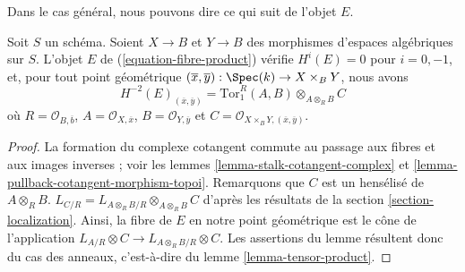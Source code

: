 \noindent
Dans le cas général, nous pouvons dire ce qui suit de l'objet $E$.

\begin{lemma}
\label{lemma-fibre-product}
Soit $S$ un schéma. Soient $X \to B$ et $Y \to B$ des morphismes d'espaces
algébriques sur $S$. L'objet $E$ de (\ref{equation-fibre-product}) vérifie
$H^i(E) = 0$ pour $i = 0, -1$, et, pour tout point géométrique
$(\overline{x}, \overline{y}) : \Spec(k) \to X \times_B Y$, nous avons
$$
H^{-2}(E)_{(\overline{x}, \overline{y})} =
\text{Tor}_1^R(A, B) \otimes_{A \otimes_R B} C
$$
où $R = \mathcal{O}_{B, \overline{b}}$, $A = \mathcal{O}_{X, \overline{x}}$,
$B = \mathcal{O}_{Y, \overline{y}}$ et
$C = \mathcal{O}_{X \times_B Y, (\overline{x}, \overline{y})}$.
\end{lemma}

\begin{proof}
La formation du complexe cotangent commute au passage aux fibres et aux images
inverses ; voir les lemmes \ref{lemma-stalk-cotangent-complex} et
\ref{lemma-pullback-cotangent-morphism-topoi}. Remarquons que $C$ est un
hensélisé de $A \otimes_R B$.
$L_{C/R} = L_{A \otimes_R B/R} \otimes_{A \otimes_R B} C$
d'après les résultats de la section \ref{section-localization}. Ainsi, la fibre
de $E$ en notre point géométrique est le cône de l'application
$L_{A/R} \otimes C \to L_{A \otimes_R B/R} \otimes C$. Les assertions du
lemme résultent donc du cas des anneaux, c'est-à-dire du lemme
\ref{lemma-tensor-product}.
\end{proof}














